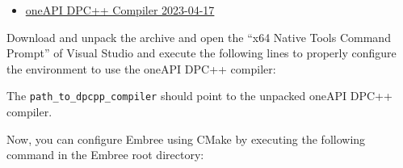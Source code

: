 \begin{itemize}
\tightlist
\item
  \href{https://github.com/intel/llvm/releases/download/sycl-nightly\%2F20230417/dpcpp-compiler-win.tar.gz}{oneAPI
  DPC++ Compiler 2023-04-17}
\end{itemize}

Download and unpack the archive and open the ``x64 Native Tools Command
Prompt'' of Visual Studio and execute the following lines to properly
configure the environment to use the oneAPI DPC++ compiler:

\begin{Shaded}
\begin{Highlighting}[]
\end{Highlighting}
\end{Shaded}

The \texttt{path\_to\_dpcpp\_compiler} should point to the unpacked
oneAPI DPC++ compiler.

Now, you can configure Embree using CMake by executing the following
command in the Embree root directory:

\begin{Shaded}
\begin{Highlighting}[]
\OperatorTok{{-}}
      \OperatorTok{{-}}
      \OperatorTok{{-}}\OperatorTok{=}
      \OperatorTok{{-}}\OperatorTok{=}\OperatorTok{++}
      \OperatorTok{{-}}\OperatorTok{=}
      \OperatorTok{{-}}\OperatorTok{=}
      \OperatorTok{{-}}\OperatorTok{=}
\end{Highlighting}
\end{Shaded}

